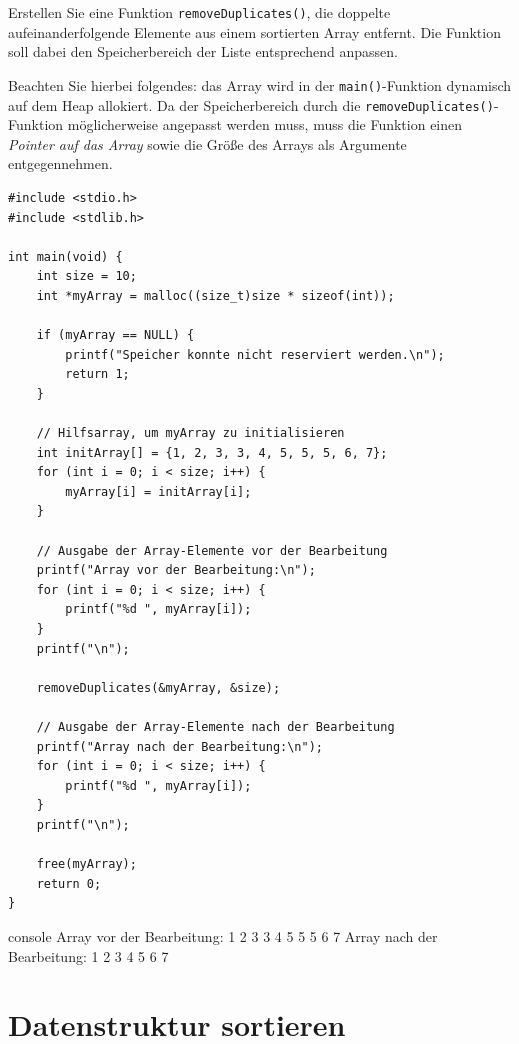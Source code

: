 \vspace{10pt}

Erstellen Sie eine Funktion \texttt{removeDuplicates()}, die doppelte
aufeinanderfolgende Elemente aus einem sortierten Array entfernt. Die Funktion
soll dabei den Speicherbereich der Liste entsprechend anpassen.

Beachten Sie hierbei folgendes: das Array wird in der
\texttt{main()}-Funktion dynamisch auf dem Heap allokiert. Da der
Speicherbereich durch die \texttt{removeDuplicates()}-Funktion
möglicherweise angepasst werden muss, muss die Funktion einen \textit{Pointer
auf das Array} sowie die Größe des Arrays als Argumente entgegennehmen.

\Vorlage
\begin{verbatim}
#include <stdio.h>
#include <stdlib.h>

int main(void) {
    int size = 10;
    int *myArray = malloc((size_t)size * sizeof(int));

    if (myArray == NULL) {
        printf("Speicher konnte nicht reserviert werden.\n");
        return 1;
    }

    // Hilfsarray, um myArray zu initialisieren
    int initArray[] = {1, 2, 3, 3, 4, 5, 5, 5, 6, 7};
    for (int i = 0; i < size; i++) {
        myArray[i] = initArray[i];
    }

    // Ausgabe der Array-Elemente vor der Bearbeitung
    printf("Array vor der Bearbeitung:\n");
    for (int i = 0; i < size; i++) {
        printf("%d ", myArray[i]);
    }
    printf("\n");

    removeDuplicates(&myArray, &size);

    // Ausgabe der Array-Elemente nach der Bearbeitung
    printf("Array nach der Bearbeitung:\n");
    for (int i = 0; i < size; i++) {
        printf("%d ", myArray[i]);
    }
    printf("\n");

    free(myArray);
    return 0;
}
\end{verbatim}

\begin{mybox}[Bildschirmausgabe]{console}
Array vor der Bearbeitung:
1 2 3 3 4 5 5 5 6 7
Array nach der Bearbeitung:
1 2 3 4 5 6 7
\end{mybox}







\chapter{Datenstruktur sortieren}

